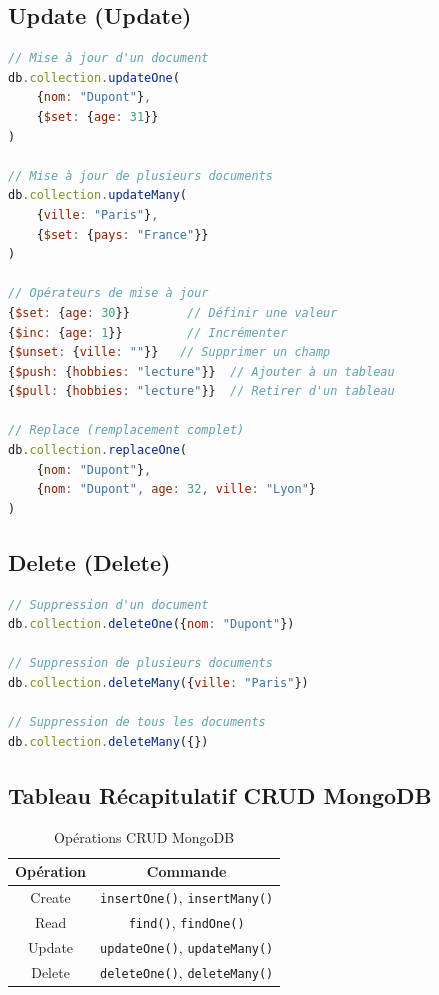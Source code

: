 \documentclass[11pt,a4paper]{article}
\begin{document}
\subsection{Update (Update)}

\begin{lstlisting}[language=JavaScript]
// Mise à jour d'un document
db.collection.updateOne(
    {nom: "Dupont"},
    {$set: {age: 31}}
)

// Mise à jour de plusieurs documents
db.collection.updateMany(
    {ville: "Paris"},
    {$set: {pays: "France"}}
)

// Opérateurs de mise à jour
{$set: {age: 30}}        // Définir une valeur
{$inc: {age: 1}}         // Incrémenter
{$unset: {ville: ""}}   // Supprimer un champ
{$push: {hobbies: "lecture"}}  // Ajouter à un tableau
{$pull: {hobbies: "lecture"}}  // Retirer d'un tableau

// Replace (remplacement complet)
db.collection.replaceOne(
    {nom: "Dupont"},
    {nom: "Dupont", age: 32, ville: "Lyon"}
)
\end{lstlisting}

\subsection{Delete (Delete)}

\begin{lstlisting}[language=JavaScript]
// Suppression d'un document
db.collection.deleteOne({nom: "Dupont"})

// Suppression de plusieurs documents
db.collection.deleteMany({ville: "Paris"})

// Suppression de tous les documents
db.collection.deleteMany({})
\end{lstlisting}

\subsection{Tableau Récapitulatif CRUD MongoDB}

\begin{table}[h]
\centering
\begin{tabular}{|c|c|}
\hline
\textbf{Opération} & \textbf{Commande} \\
\hline
Create & \texttt{insertOne()}, \texttt{insertMany()} \\
\hline
Read & \texttt{find()}, \texttt{findOne()} \\
\hline
Update & \texttt{updateOne()}, \texttt{updateMany()} \\
\hline
Delete & \texttt{deleteOne()}, \texttt{deleteMany()} \\
\hline
\end{tabular}
\caption{Opérations CRUD MongoDB}
\end{table}
\end{document}
